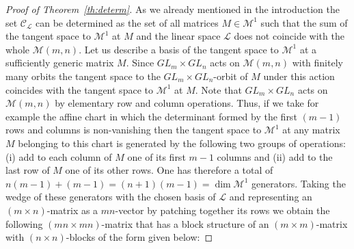 \documentclass[10pt,twoside,a4paper,reqno]{amsart}
\theoremstyle{plain}
\theoremstyle{definition}
\theoremstyle{remark}
\begin{document}
\begin{proof}[Proof of Theorem~\ref{th:determ}]
As we already mentioned in the introduction the set ${\mathcal C}_{\mathcal L}$ can be determined as the set of all matrices $M \in {\mathcal {M}}^1$ such that the sum of the tangent space to ${\mathcal {M}}^1$ at $M$  and the linear space ${\mathcal L}$ does not coincide with the whole ${\mathcal {M}}(m,n)$. Let us describe  a basis of the tangent space to ${\mathcal {M}}^1$ at a sufficiently generic matrix $M$. Since $GL_m\times  GL_n$ acts on ${\mathcal {M}}(m,n)$ with finitely many orbits the tangent space to the $GL_m\times  GL_n$-orbit of $M$ under this action coincides with the tangent space to ${\mathcal {M}}^1$ at $M$. Note that  $GL_m\times  GL_n$ acts on ${\mathcal {M}}(m,n)$ by elementary row and column operations. Thus, if we take for example the affine chart in which the determinant formed by the first $(m-1)$ rows and columns is non-vanishing then  the tangent space to ${\mathcal {M}}^1$ at any  matrix $M$ belonging to  this chart is generated by the following two groups of operations: (i) add to each column of $M$ one of its first $m-1$ columns and (ii) add to the last row of $M$ one of its other rows. One has therefore a total of $n(m-1)+(m-1)=(n+1)(m-1)=\dim {\mathcal {M}}^1$ generators.  Taking the wedge of these generators with the chosen basis of ${\mathcal L}$ and representing an $(m\times n)$-matrix as a $mn$-vector by patching together its rows we obtain the following  $(mn\times mn)$-matrix that has a block structure of an $(m\times m)$-matrix with $(n\times n)$-blocks of the form given below:


\end{proof}
\end{document}
